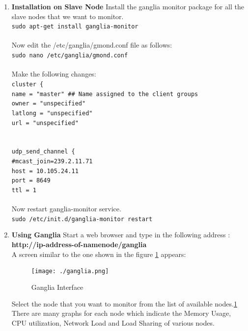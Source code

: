 \documentclass[12pt]{book}
\newcommand{\shellcmd}[1]{\\\indent\texttt{\footnotesize #1}\\}
\begin{document}
\begin{enumerate}
\item \textbf{Installation on Slave Node}
Install the ganglia monitor package for all the slave nodes that we want to monitor.
\shellcmd{sudo apt-get install ganglia-monitor}\\\noindent
Now edit the /etc/ganglia/gmond.conf file as follows:
\shellcmd{sudo nano /etc/ganglia/gmond.conf}\\\noindent
Make the following changes:
\shellcmd{cluster \{ \\\indent 
name = "master" \#\# Name assigned to the client groups\\\indent 
owner = "unspecified"\\\indent 
latlong = "unspecified"\\\indent 
url = "unspecified"\\\indent }
\shellcmd{udp\_send\_channel \{ \\\indent 
\#mcast\_join=239.2.11.71\\\indent 
host = 10.105.24.11\\\indent 
port = 8649\\\indent 
ttl = 1\\\indent}
Now restart ganglia-monitor service.
\shellcmd{sudo /etc/init.d/ganglia-monitor restart}
\item \textbf{Using Ganglia}
Start a web browser and type in the following address :
\textbf{http://ip-address-of-namenode/ganglia}\\
A screen similar to the one shown in the figure \ref{fig:fig2_ganglia} appears:
\begin{figure}[hb]
 \centering
 \texttt{[image: ./ganglia.png]}
 \caption{Ganglia Interface \label{fig:fig2_ganglia}} 
\end{figure}
Select the node that you want to monitor from the list of available nodes.\ref{fig:fig2_ganglia} There are
many graphs for each node which indicate the Memory Usage, CPU utilization, Network
Load and Load Sharing of various nodes.
\end{enumerate}




\end{document}
